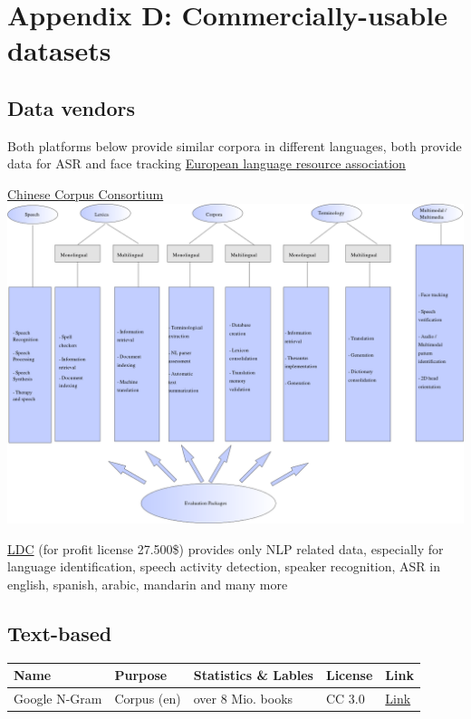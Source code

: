 \hypertarget{commercially-usable-data-sets}{%
\section{Appendix D: Commercially-usable datasets}\label{commercially-usable-data-sets}}

\hypertarget{data-vendors}{%
\subsection{Data vendors}\label{data-vendors}}

Both platforms below provide similar corpora in different languages,
both provide data for ASR and face tracking
\href{http://catalogue.elra.info/en-us/}{European language resource
association}

\href{http://www.d-ear.com/CCC/corpora.htm}{Chinese Corpus Consortium} \\
\includegraphics[width=\textwidth]{img/ELRA_supply2.png}

\href{https://catalog.ldc.upenn.edu/byproject}{LDC} (for profit license
27.500\$) provides only NLP related data, especially for language
identification, speech activity detection, speaker recognition, ASR in
english, spanish, arabic, mandarin and many more

\hypertarget{text-based}{%
\subsection{Text-based}\label{text-based}}

\begin{longtable}[]{@{}p{}p{}p{}p{}p{}@{}}
\toprule
Name & Purpose & Statistics \& Lables & License & Link\tabularnewline
\midrule
\endhead
Google N-Gram & Corpus (en) & over 8 Mio. books & CC 3.0 &
\href{http://storage.googleapis.com/books/ngrams/books/datasetsv2.html}{Link}\tabularnewline
\bottomrule
\end{longtable}

